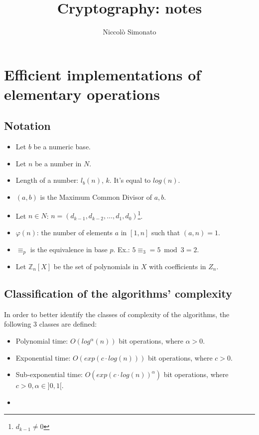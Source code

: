 \documentclass[12pt, a4paper, english]{report}
\author{Niccolò Simonato}
\title{Cryptography: notes}
\begin{document}
\maketitle

\tableofcontents

\chapter{Efficient implementations of elementary operations}
\section{Notation}
\begin{itemize}
    \item Let $b$ be a numeric base.
    \item Let $n$ be a number in $N$.
    \item Length of a number: $l_{b}(n)$, $k$. It's equal to $log(n)$.
    \item $(a,b)$ is the Maximum Common Divisor of $a,b$.
    \item Let $n \in N$: $n = (d_{k-1}, d_{k-2}, \dots, d_{1}, d_{0})$\footnote{$d_{k-1} \neq 0$}.
    \item $\varphi(n)$: the number of elements $a$ in $[1,n]$ such that $(a,n) = 1$.
    \item $\equiv_{p}$ is the equivalence in base $p$. Ex.: $5 \equiv_{3} = 5 \bmod 3 = 2 $.
    \item Let $\mathbb{Z}_{n}[X]$ be the set of polynomials in $X$ with coefficients in $Z_{n}$.
\end{itemize}


\section{Classification of the algorithms' complexity}
In order to better identify the classes of complexity of the algorithms, the following 3 classes are defined:
\begin{itemize}
    \item Polynomial time: $O(log^{\alpha}(n))$ bit operations, where $\alpha > 0$.
    \item Exponential time: $O(exp(c \cdot log(n)))$ bit operations, where $c > 0$.
    \item Sub-exponential time: $O(exp(c \cdot log(n))^{\alpha})$ bit operations, where $c > 0, \alpha \in ]0, 1[$.
\item
\end{itemize}
\end{document}
